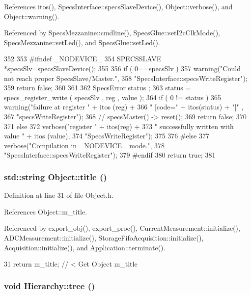 References itos(), SpecsInterface::specsSlaveDevice(), Object::verbose(), and Object::warning().

Referenced by SpecsMezzanine::cmdline(), SpecsGlue::setI2cClkMode(), SpecsMezzanine::setLed(), and SpecsGlue::setLed().


\begin{DoxyCode}
352                                                            {
353 #ifndef _NODEVICE_
354   SPECSSLAVE *specsSlv=specsSlaveDevice();
355 
356   if ( 0==specsSlv  ){
357     warning("Could not reach proper SpecsSlave/Master.",
358             "SpecsInterface::specsWriteRegister");
359     return false;
360   }
361   
362   SpecsError status ;
363   status = specs_register_write ( specsSlv , reg , value ); 
364   if ( 0 != status ){
365     warning("failure at register " + itos (reg) +
366             " [code=" + itos(status) + "]" ,
367             "specsWriteRegister");
368     //    specsMaster() -> reset();
369     return false;
370   }
371   else {
372     verbose("register " + itos(reg) +
373             " successfully written with value " + itos (value),
374             "SpecsWriteRegister");
375   }
376 #else
377   verbose("Compilation in _NODEVICE_ mode.",
378           "SpecsInterface::specsWriteRegister");
379 #endif
380   return true;
381 }
\end{DoxyCode}
\hypertarget{classObject_a73a0f1a41828fdd8303dd662446fb6c3}{
\subsubsection[{title}]{\setlength{\rightskip}{0pt plus 5cm}std::string Object::title ()}}
\label{classObject_a73a0f1a41828fdd8303dd662446fb6c3}


Definition at line 31 of file Object.h.

References Object::m\_\-title.

Referenced by export\_\-obj(), export\_\-proc(), CurrentMeasurement::initialize(), ADCMeasurement::initialize(), StorageFifoAcquisition::initialize(), Acquisition::initialize(), and Application::terminate().


\begin{DoxyCode}
31 { return m_title;      } // < Get Object m_title
\end{DoxyCode}
\hypertarget{classHierarchy_a594c294c5f60c230e106d522ed008212}{
\subsubsection[{tree}]{\setlength{\rightskip}{0pt plus 5cm}void Hierarchy::tree ()}}
\label{classHierarchy_a594c294c5f60c230e106d522ed008212}


